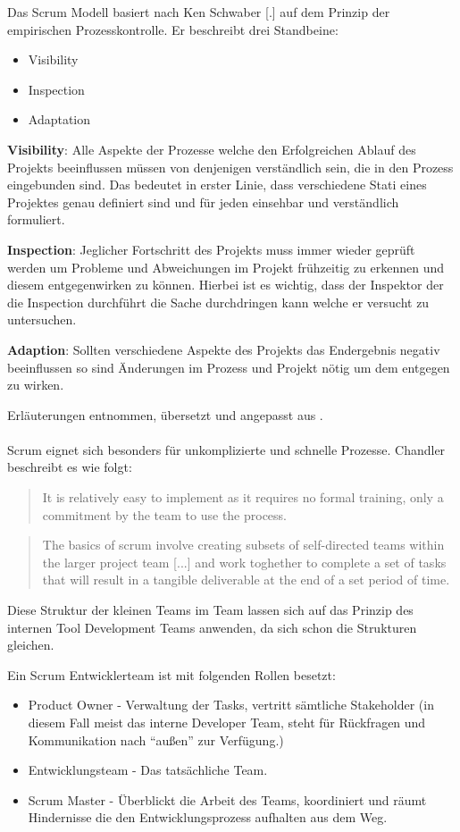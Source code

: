 \documentclass[pagesize, paper=a4, fontsize=12pt, titlepage=true, headings=small, headnosepline, abstractoff, liststotoc, nochapterprefix, plainheadsepline, twoside]{scrreprt}
\begin{document}
Das Scrum Modell basiert nach Ken Schwaber [.] auf dem Prinzip der empirischen Prozesskontrolle. Er beschreibt drei Standbeine:
\begin{itemize}
\item Visibility
\item Inspection
\item Adaptation
\end{itemize}

\textbf{Visibility}: Alle Aspekte der Prozesse welche den Erfolgreichen Ablauf des Projekts beeinflussen müssen von denjenigen verständlich sein, die in den Prozess eingebunden sind. Das bedeutet in erster Linie, dass verschiedene Stati eines Projektes genau definiert sind und für jeden einsehbar und verständlich formuliert. 

\textbf{Inspection}: Jeglicher Fortschritt des Projekts muss immer wieder geprüft werden um Probleme und Abweichungen im Projekt frühzeitig zu erkennen und diesem entgegenwirken zu können. Hierbei ist es wichtig, dass der Inspektor der die Inspection durchführt die Sache durchdringen kann welche er versucht zu untersuchen.

\textbf{Adaption}: Sollten verschiedene Aspekte des Projekts das Endergebnis negativ beeinflussen so sind Änderungen im Prozess und Projekt nötig um dem entgegen zu wirken.

Erläuterungen entnommen, übersetzt und angepasst aus .
\\
\\
Scrum eignet sich besonders für unkomplizierte und schnelle Prozesse. Chandler beschreibt es wie folgt:
\begin{quote}
\glqq It is relatively easy to implement as it requires no formal training, only a commitment by the team to use the process.\grqq{}
\cite[S. 45]{Chandler2006}
\end{quote}
\begin{quote}
\glqq The basics of scrum involve creating subsets of self-directed teams within the larger project team [...] and work toghether to complete a set of tasks that will result in a tangible deliverable at the end of a set period of time.\grqq{}
\cite[S. 45]{Chandler2006}
\end{quote}
Diese Struktur der kleinen Teams im Team lassen sich auf das Prinzip des internen Tool Development Teams anwenden, da sich schon die Strukturen gleichen.

Ein Scrum Entwicklerteam ist mit folgenden Rollen besetzt:
\begin{itemize}
\item Product Owner - Verwaltung der Tasks, vertritt sämtliche Stakeholder (in diesem Fall meist das interne Developer Team, steht für Rückfragen und Kommunikation nach “außen” zur Verfügung.)
\item Entwicklungsteam - Das tatsächliche Team.
\item Scrum Master - Überblickt die Arbeit des Teams, koordiniert und räumt Hindernisse die den Entwicklungsprozess aufhalten aus dem Weg.
\end{itemize}
\end{document}
